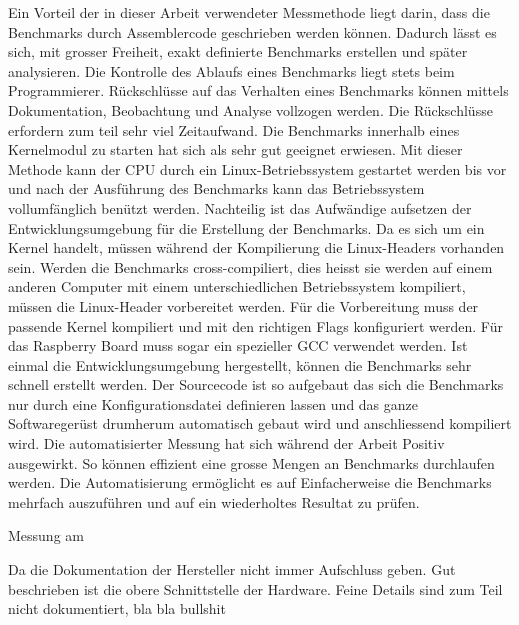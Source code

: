 \par
Ein Vorteil der in dieser Arbeit verwendeter Messmethode liegt darin, dass die Benchmarks durch Assemblercode geschrieben werden können. Dadurch lässt es sich, mit grosser Freiheit, exakt definierte Benchmarks erstellen und später analysieren. Die Kontrolle des Ablaufs eines Benchmarks liegt stets beim Programmierer. Rückschlüsse auf das Verhalten eines Benchmarks können mittels Dokumentation, Beobachtung und Analyse vollzogen werden. Die Rückschlüsse erfordern zum teil sehr viel Zeitaufwand. Die Benchmarks innerhalb eines Kernelmodul zu starten hat sich als sehr gut geeignet erwiesen. Mit dieser Methode kann der CPU durch ein Linux-Betriebssystem gestartet werden bis vor und nach der Ausführung des Benchmarks kann das Betriebssystem vollumfänglich benützt werden. Nachteilig ist das Aufwändige aufsetzen der Entwicklungsumgebung für die Erstellung der Benchmarks. Da es sich um ein Kernel handelt, müssen während der Kompilierung die Linux-Headers vorhanden sein. Werden die Benchmarks cross-compiliert, dies heisst sie werden auf einem anderen Computer mit einem unterschiedlichen Betriebssystem kompiliert, müssen die Linux-Header vorbereitet werden. Für die Vorbereitung muss der passende Kernel kompiliert und mit den richtigen Flags konfiguriert werden. Für das Raspberry Board muss sogar ein spezieller GCC verwendet werden. Ist einmal die Entwicklungsumgebung hergestellt, können die Benchmarks sehr schnell erstellt werden. Der Sourcecode ist so aufgebaut das sich die Benchmarks nur durch eine Konfigurationsdatei definieren lassen und das ganze Softwaregerüst drum­he­r­um automatisch gebaut wird und anschliessend kompiliert wird. Die automatisierter Messung hat sich während der Arbeit Positiv ausgewirkt. So können effizient eine grosse Mengen an Benchmarks durchlaufen werden. Die Automatisierung ermöglicht es auf Einfacherweise die Benchmarks mehrfach auszuführen und auf ein wiederholtes Resultat zu prüfen.


Messung am 



Da die Dokumentation der Hersteller nicht immer Aufschluss geben. Gut beschrieben ist die obere Schnittstelle der Hardware. Feine Details sind zum Teil nicht dokumentiert, bla bla bullshit


















